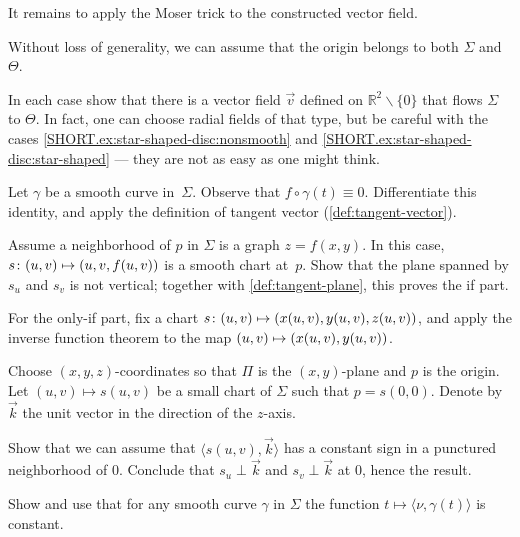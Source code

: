 \begin{multicols}{2}
It remains to apply the Moser trick to the constructed vector field. 

Without loss of generality, we can assume that the origin belongs to both $\Sigma$ and~$\Theta$.

In each case show that there is a vector field $\vec v$ defined on $\mathbb{R}^2\backslash\{0\}$ that flows $\Sigma$ to $\Theta$.
In fact, one can choose radial fields of that type,
but be careful with the cases \ref{SHORT.ex:star-shaped-disc:nonsmooth} and \ref{SHORT.ex:star-shaped-disc:star-shaped} --- they are not as easy as one might think.


\setcounter{eqtn}{0}

Let $\gamma$ be a smooth curve in~$\Sigma$.
Observe that $f\circ\gamma(t)\equiv 0$.
Differentiate this identity, and apply the definition of tangent vector (\ref{def:tangent-vector}).

Assume a neighborhood of $p$ in $\Sigma$ is a graph $z=f(x,y)$.
In this case, $s\:(u,v)\z\mapsto (u,v,f(u,v))$ is a smooth chart at~$p$.
Show that the plane spanned by $s_u$ and $s_v$ is not vertical;
together with \ref{def:tangent-plane}, this proves the if part.

For the only-if part, fix a chart 
$s\:(u,v)\z\mapsto(x(u,v),y(u,v),z(u,v))$,
and apply the inverse function theorem to the map $(u,v)\z\mapsto(x(u,v),y(u,v))$.

Choose $(x,y,z)$-coordinates so that $\Pi$ is the $(x,y)$-plane and $p$ is the origin.
Let $(u,v)\mapsto s(u,v)$ be a small chart of $\Sigma$ such that $p=s(0,0)$.
Denote by $\vec k$ the unit vector in the direction of the $z$-axis.

Show that we can assume that $\langle s(u,v),\vec k\rangle$ has a constant sign in a punctured neighborhood of $0$.
Conclude that $s_u\perp \vec k$ and $s_v\perp \vec k$ at
$0$, hence the result.

Show and use that for any smooth curve $\gamma$ in $\Sigma$ the function $t\mapsto \langle\nu,\gamma(t)\rangle$ is constant.


\end{multicols}
